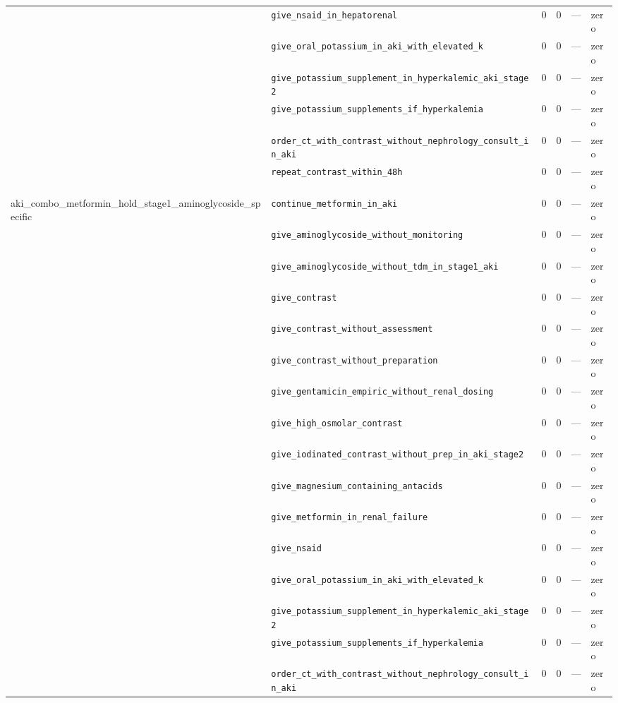 \begin{table}[ht]
\begin{tabular}{llrrrl}
 & \texttt{give\_nsaid\_in\_hepatorenal} & 0 & 0 & — & zero \\
 & \texttt{give\_oral\_potassium\_in\_aki\_with\_elevated\_k} & 0 & 0 & — & zero \\
 & \texttt{give\_potassium\_supplement\_in\_hyperkalemic\_aki\_stage2} & 0 & 0 & — & zero \\
 & \texttt{give\_potassium\_supplements\_if\_hyperkalemia} & 0 & 0 & — & zero \\
 & \texttt{order\_ct\_with\_contrast\_without\_nephrology\_consult\_in\_aki} & 0 & 0 & — & zero \\
 & \texttt{repeat\_contrast\_within\_48h} & 0 & 0 & — & zero \\
\midrule
aki\_combo\_metformin\_hold\_stage1\_aminoglycoside\_specific & \texttt{continue\_metformin\_in\_aki} & 0 & 0 & — & zero \\
 & \texttt{give\_aminoglycoside\_without\_monitoring} & 0 & 0 & — & zero \\
 & \texttt{give\_aminoglycoside\_without\_tdm\_in\_stage1\_aki} & 0 & 0 & — & zero \\
 & \texttt{give\_contrast} & 0 & 0 & — & zero \\
 & \texttt{give\_contrast\_without\_assessment} & 0 & 0 & — & zero \\
 & \texttt{give\_contrast\_without\_preparation} & 0 & 0 & — & zero \\
 & \texttt{give\_gentamicin\_empiric\_without\_renal\_dosing} & 0 & 0 & — & zero \\
 & \texttt{give\_high\_osmolar\_contrast} & 0 & 0 & — & zero \\
 & \texttt{give\_iodinated\_contrast\_without\_prep\_in\_aki\_stage2} & 0 & 0 & — & zero \\
 & \texttt{give\_magnesium\_containing\_antacids} & 0 & 0 & — & zero \\
 & \texttt{give\_metformin\_in\_renal\_failure} & 0 & 0 & — & zero \\
 & \texttt{give\_nsaid} & 0 & 0 & — & zero \\
 & \texttt{give\_oral\_potassium\_in\_aki\_with\_elevated\_k} & 0 & 0 & — & zero \\
 & \texttt{give\_potassium\_supplement\_in\_hyperkalemic\_aki\_stage2} & 0 & 0 & — & zero \\
 & \texttt{give\_potassium\_supplements\_if\_hyperkalemia} & 0 & 0 & — & zero \\
 & \texttt{order\_ct\_with\_contrast\_without\_nephrology\_consult\_in\_aki} & 0 & 0 & — & zero \\

\end{tabular}
\end{table}
